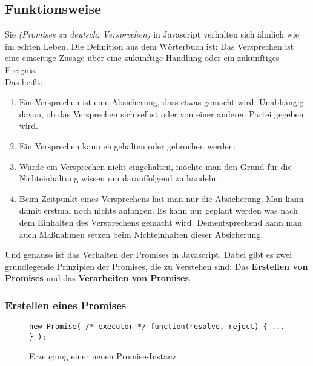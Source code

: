 \subsection{Funktionsweise}

\noindent
Sie \textit{(\glqq{}Promises\grqq{} zu deutsch: Versprechen)} in Javascript verhalten sich ähnlich wie im echten Leben. Die Definition aus dem Wörterbuch ist: Das Versprechen ist eine einseitige Zusage über eine zukünftige Handlung oder ein zukünftiges Ereignis. \cite{versprechen} \\

\noindent
Das heißt:

\begin{enumerate}
    \item Ein Versprechen ist eine Absicherung, dass etwas gemacht wird. Unabhängig davon, ob das Versprechen sich selbst oder von einer anderen Partei gegeben wird.
    
    \item Ein Versprechen kann eingehalten oder gebrochen werden.
    
    \item Wurde ein Versprechen nicht eingehalten, möchte man den Grund für die Nichteinhaltung wissen um darauffolgend zu handeln.
    
    \item Beim Zeitpunkt eines Versprechens hat man nur die Absicherung. Man kann damit erstmal noch nichts anfangen. Es kann nur geplant werden was nach dem Einhalten des Versprechens gemacht wird. Dementsprechend kann man auch Maßnahmen setzen beim Nichteinhalten dieser Absicherung.
    
\end{enumerate}

\noindent
Und genauso ist das Verhalten der Promises in Javascript. Dabei gibt es zwei grundlegende Prinzipien der Promises, die zu Verstehen sind: Das \textbf{Erstellen von Promises} und das \textbf{Verarbeiten von Promises}.

\subsubsection{Erstellen eines Promises}

\begin{figure}[H]
\begin{lstlisting}
new Promise( /* executor */ function(resolve, reject) { ... } );
\end{lstlisting}
\caption{Erzeugung einer neuen Promise-Instanz}
\end{figure}

